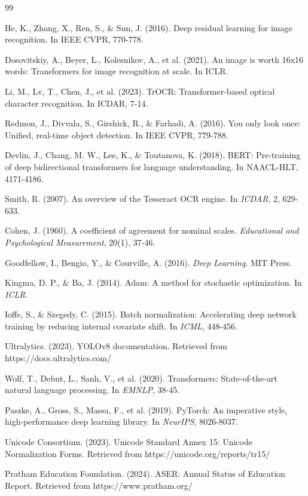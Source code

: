 \documentclass[14pt,a4paper]{article}
\begin{document}
\begin{thebibliography}{99}

 He, K., Zhang, X., Ren, S., \& Sun, J. (2016). Deep residual learning for image recognition. In IEEE CVPR, 770-778.

 Dosovitskiy, A., Beyer, L., Kolesnikov, A., et al. (2021). An image is worth 16x16 words: Transformers for image recognition at scale. In ICLR.

 Li, M., Lv, T., Chen, J., et al. (2023). TrOCR: Transformer-based optical character recognition. In ICDAR, 7-14.

 Redmon, J., Divvala, S., Girshick, R., \& Farhadi, A. (2016). You only look once: Unified, real-time object detection. In IEEE CVPR, 779-788.

 Devlin, J., Chang, M. W., Lee, K., \& Toutanova, K. (2018). BERT: Pre-training of deep bidirectional transformers for language understanding. In NAACL-HLT, 4171-4186.

 Smith, R. (2007). An overview of the Tesseract OCR engine. In \textit{ICDAR}, 2, 629-633.

 Cohen, J. (1960). A coefficient of agreement for nominal scales. \textit{Educational and Psychological Measurement}, 20(1), 37-46.

 Goodfellow, I., Bengio, Y., \& Courville, A. (2016). \textit{Deep Learning}. MIT Press.

 Kingma, D. P., \& Ba, J. (2014). Adam: A method for stochastic optimization. In \textit{ICLR}.

 Ioffe, S., \& Szegedy, C. (2015). Batch normalization: Accelerating deep network training by reducing internal covariate shift. In \textit{ICML}, 448-456.

 Ultralytics. (2023). YOLOv8 documentation. Retrieved from https://docs.ultralytics.com/

 Wolf, T., Debut, L., Sanh, V., et al. (2020). Transformers: State-of-the-art natural language processing. In \textit{EMNLP}, 38-45.

 Paszke, A., Gross, S., Massa, F., et al. (2019). PyTorch: An imperative style, high-performance deep learning library. In \textit{NeurIPS}, 8026-8037.

 Unicode Consortium. (2023). Unicode Standard Annex 15: Unicode Normalization Forms. Retrieved from https://unicode.org/reports/tr15/

 Pratham Education Foundation. (2024). ASER: Annual Status of Education Report. Retrieved from https://www.pratham.org/

\end{thebibliography}
\newpage
\end{document}
